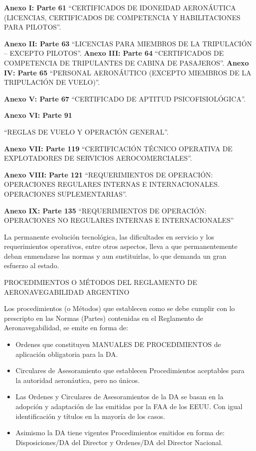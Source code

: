 \textbf{Anexo I: Parte 61} “CERTIFICADOS DE IDONEIDAD AERONÁUTICA (LICENCIAS, CERTIFICADOS DE COMPETENCIA Y HABILITACIONES PARA PILOTOS”.

\textbf{Anexo II: Parte 63} “LICENCIAS PARA MIEMBROS DE LA TRIPULACIÓN – EXCEPTO PILOTOS”. \textbf{Anexo III: Parte 64} “CERTIFICADOS DE COMPETENCIA DE TRIPULANTES DE CABINA DE PASAJEROS”. \textbf{Anexo IV: Parte 65} “PERSONAL AERONÁUTICO (EXCEPTO MIEMBROS DE LA TRIPULACIÓN DE VUELO)”.

\textbf{Anexo V: Parte 67} “CERTIFICADO DE APTITUD PSICOFISIOLÓGICA”.

\textbf{Anexo VI: Parte 91}



“REGLAS DE VUELO Y OPERACIÓN GENERAL”.

\textbf{Anexo VII: Parte 119} “CERTIFICACIÓN TÉCNICO OPERATIVA DE EXPLOTADORES DE SERVICIOS AEROCOMERCIALES”.

\textbf{Anexo VIII: Parte 121} “REQUERIMIENTOS DE OPERACIÓN: OPERACIONES REGULARES INTERNAS E INTERNACIONALES. OPERACIONES SUPLEMENTARIAS”.

\textbf{Anexo IX: Parte 135} “REQUERIMIENTOS DE OPERACIÓN: OPERACIONES NO REGULARES INTERNAS E INTERNACIONALES”

La permanente evolución tecnológica, las dificultades en servicio y los requerimientos operativos, entre otros aspectos, lleva a que permanentemente deban enmendarse las normas y aun sustituirlas, lo que demanda un gran esfuerzo al estado.

PROCEDIMIENTOS O MÉTODOS DEL REGLAMENTO DE AERONAVEGABILIDAD ARGENTINO

Los procedimientos (o Métodos) que establecen como se debe cumplir con lo prescripto en las Normas (Partes) contenidas en el Reglamento de Aeronavegabilidad, se emite en forma de:

\begin{itemize}
  \item Ordenes que constituyen MANUALES DE PROCEDIMIENTOS de aplicación obligatoria para la DA.
  \item Circulares de Asesoramiento que establecen Procedimientos aceptables para la autoridad aeronáutica, pero no únicos.
  \item Las Ordenes y Circulares de Asesoramientos de la DA se basan en la adopción y adaptación de las emitidas por la FAA de los EEUU. Con igual identificación y títulos en la mayoría de los casos.
  \item Asimismo la DA tiene vigentes Procedimientos emitidos en forma de: Disposiciones/DA del Director y Ordenes/DA del Director Nacional.
\end{itemize}
